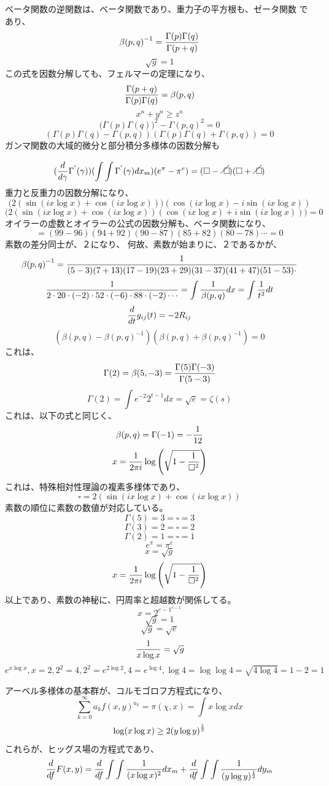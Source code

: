 \documentclass{jsarticle}
\begin{document}
{  ベータ関数の逆関数は、ベータ関数であり、重力子の平方根も、ゼータ関数
  であり、
  $$ {\beta(p,q)}^{-1} = {{\Gamma(p)\Gamma(q)} \over {\Gamma(p+q)}} $$
  $$ {\sqrt{g}} = 1 $$
  この式を因数分解しても、フェルマーの定理になり、　
  $$ {{\Gamma(p+q)} \over {\Gamma(p)\Gamma(q)}} = \beta(p,q) $$
  $$ x^n + y^n \ge z^n $$
  $$ {({\Gamma(p)\Gamma(q))}^2 - {\Gamma(p,q)}^2} = 0 $$
  $$ {({{\Gamma(p)\Gamma(q)} - \Gamma(p,q)}){(\Gamma(p)\Gamma(q)
  + \Gamma(p,q))}} = 0 $$
  ガンマ関数の大域的微分と部分積分多様体の因数分解も
  $$ {({d \over {d\gamma}}\Gamma^{'}(\gamma))}{(\int\int{\Gamma^{'}(\gamma)
  }dx_m)}{(e^{\pi} - \pi^{e})} = {(\square - \alearletter)}{(\square
  + \alearletter)} $$
  重力と反重力の因数分解になり、
  $$ {(2{(\sin(i x \log x) + \cos(i x \log x)))}}
  {(\cos(ix \log x) -
  i\sin(ix \log x))} $$
  $${(2{(\sin(i x \log x) + \cos(i x \log x))}}
  {(\cos(ix \log x)+ 
  i\sin(ix \log x)))} = 0 $$
  オイラーの虚数とオイラーの公式の因数分解も、ベータ関数になり、
  $$ = {(99 - 96)(94 + 92)(90 - 87)(85 + 82)(80 - 78)\cdots} = 0 $$
  素数の差分同士が、２になり、
  何故、素数が始まりに、２であるかが、
  $$ {\beta(p,q)}^{-1}  = {1 \over {(5 - 3)(7 + 13)(17 - 19)(23 + 29)
  (31 - 37)(41 + 47)(51 - 53)\cdot}} $$
  $$ {1 \over {2\cdot 20 \cdot (-2)\cdot 52 
  \cdot (-6) \cdot 88 \cdot (-2) \cdots}}
  = \int {1 \over {\beta(p,q)}}dx = \int {1 \over {t^2}}dt  $$
  $$ {d \over {dt}}g_{ij}(t) = - 2R_{ij} $$
  $$ ({\beta(p,q) - {\beta(p,q)}^{-1}})({\beta(p,q) + {\beta(p,q)}^{-1}})
  = 0 $$
  これは、
  $$ \Gamma(2) = \beta(5,-3) = {{\Gamma(5)\Gamma(-3)} \over {\Gamma(5 - 3)}}$$
  $$ \Gamma(2) = \int e^{-2}2^{t-1}dx = \sqrt{e} = \zeta(s) $$
  これは、以下の式と同じく、
  $$ \beta(p,q) = \Gamma(-1) = {-{1 \over {12}}} $$
  $$ x = {1 \over {2\pi i}}\log\left({\sqrt{1 - {{1 \over 
  {\square^2}}}}}\right) $$
  これは、特殊相対性理論の複素多様体であり、
  $$ \square = 2{(\sin(ix \log x) + \cos(ix \log x))} $$
  素数の順位に素数の数値が対応している。
  $$ \Gamma(5) = 3 = \square = 3 $$
  $$ \Gamma(3) = 2 = \square = 2 $$
  $$ \Gamma(2) = 1 = \square = 1 $$
  $$ e^{\pi} = {\pi}^{e} $$
  $$ x = \sqrt{g} $$
  $$ x = {1 \over {2\pi i}}\log\left({\sqrt{1 - {{1 \over 
  {\square^2}}}}}\right) $$
  以上であり、素数の神秘に、円周率と超越数が関係してる。
  $$ x = 2^{{e - 1}^{e - 1}} $$
  $$ \sqrt{g} = 1 $$
  $$ \sqrt{g} = \sqrt{e} $$
  $$ {1 \over {x\log x}} = \sqrt{g} $$
  $$ e^{x\log x}, x = 2, 2^2 = 4, 2^2 = e^{2\log 2}, 4 = e^{\log 4}, 
  \log 4 = \log \log 4 = \sqrt{4 \log 4} = 1 - 2 = 1 $$

  アーベル多様体の基本群が、コルモゴロフ方程式になり、　
  $$ \sum_{k=0}^{\infty}a_k f(x,y)^{a_k} = \pi(\chi,x) = \int  x \log x dx $$
  $$ \log(x\log x) \ge {2{(y\log y)}^{1 \over 2}} $$
  これらが、ヒッグス場の方程式であり、　
  $$ {d \over {d f}}F(x,y) = {d \over df} \int \int {1 \over (x \log x)^2}dx_{m} + {d \over df} \int \int {1 \over (y \log y)^{1 \over 2}
  }dy_{m} $$

}
\end{document}
